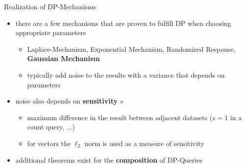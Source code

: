\documentclass[aspectratio=169]{beamer}
\begin{document}
\begin{frame}{Realization of DP-Mechanisms}
    \begin{itemize}
        \item there are a few mechanisms that are proven to fulfill DP when choosing appropriate parameters
        \begin{itemize}
            \item Laplace-Mechanism, Exponential Mechanism, Randomized Response, \textbf{Gaussian Mechanism}
            \item typically add noise to the results with a variance that depends on parameters 
        \end{itemize}
        \item<2-> noise also depends on \textbf{sensitivity} $s$
        \begin{itemize}
            \item maximum difference in the result between adjacent datasets ($s = 1$ in a count query, ...)
            \item for vectors the $\ell_2$ norm is used as a measure of sensitivity
        \end{itemize}
        \item<3-> additional theorems exist for the \textbf{composition} of DP-Queries 
    \end{itemize}
\end{frame}

\end{document}
